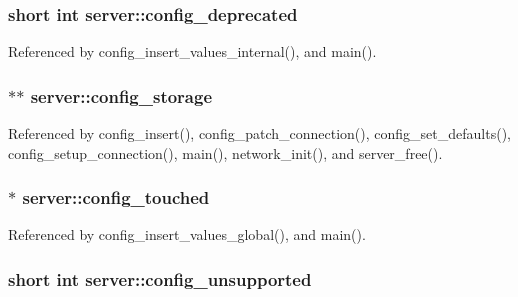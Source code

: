 \hypertarget{structserver_aef7fed0187e9b4f287cdbe799809bd08}{
\subsubsection[{config\-\_\-deprecated}]{\setlength{\rightskip}{0pt plus 5cm}short int server\-::config\-\_\-deprecated}}\label{structserver_aef7fed0187e9b4f287cdbe799809bd08}


Referenced by config\-\_\-insert\-\_\-values\-\_\-internal(), and main().

\hypertarget{structserver_aed6e10a38f54615b4c7cca2468e77765}{
\subsubsection[{config\-\_\-storage}]{$\ast$$\ast$ server\-::config\-\_\-storage}}\label{structserver_aed6e10a38f54615b4c7cca2468e77765}


Referenced by config\-\_\-insert(), config\-\_\-patch\-\_\-connection(), config\-\_\-set\-\_\-defaults(), config\-\_\-setup\-\_\-connection(), main(), network\-\_\-init(), and server\-\_\-free().

\hypertarget{structserver_a8351f042986b88eb888d85d085758020}{
\subsubsection[{config\-\_\-touched}]{$\ast$ server\-::config\-\_\-touched}}\label{structserver_a8351f042986b88eb888d85d085758020}


Referenced by config\-\_\-insert\-\_\-values\-\_\-global(), and main().

\hypertarget{structserver_a643555f00863a80ecf48eaa207483286}{
\subsubsection[{config\-\_\-unsupported}]{\setlength{\rightskip}{0pt plus 5cm}short int server\-::config\-\_\-unsupported}}\label{structserver_a643555f00863a80ecf48eaa207483286}


